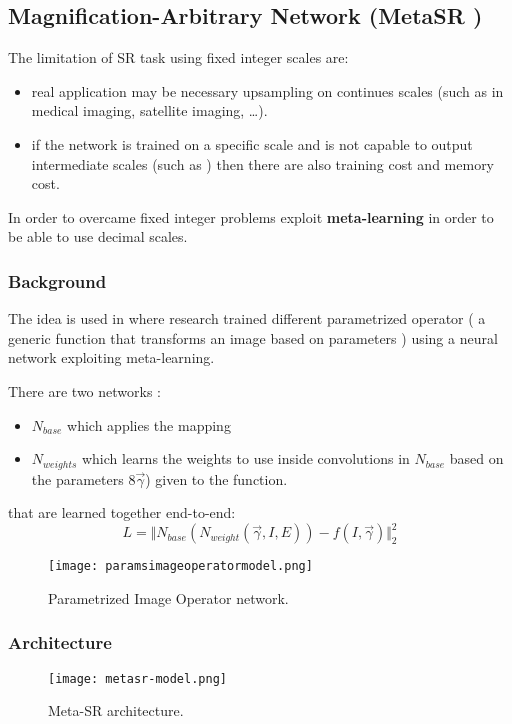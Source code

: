 \subsection{Magnification-Arbitrary Network (MetaSR \cite{MetaSR})}
The limitation of SR task using fixed integer scales are:
\begin{itemize}
    \item real application may be necessary upsampling on continues scales (such as in medical imaging, satellite imaging, \dots ).
    \item if the network is trained on a specific scale and is not capable to output intermediate scales (such as \cite{LapSRN}) then there are also training cost and memory cost.
\end{itemize}

In order to overcame fixed integer problems \cite{MetaSR} exploit \textbf{meta-learning} in order to be able to use decimal scales.

\subsubsection{Background}

The idea is used in \cite{ParametrizedImageOperator} where research trained different parametrized operator ( a generic function that transforms an image based on parameters ) using a neural network exploiting meta-learning.

There are two networks :
\begin{itemize}
    \item $N_{base}$ which applies the mapping
    \item $N_{weights}$ which learns the weights to use inside convolutions in $N_{base}$ based on the parameters 8$\vec{\gamma}$) given to the function. 
\end{itemize}
that are learned together end-to-end: 
$$
L = \Vert N_{base}(N_{weight}(\vec{\gamma},I,E)) - f(I,\vec{\gamma}) \Vert_2^2
$$
\begin{figure}
    \centering
    \texttt{[image: paramsimageoperatormodel.png]}
    \caption{Parametrized Image Operator network.}\label{PIO:model}
\end{figure}

\subsubsection{Architecture}
\begin{figure}
    \centering
    \texttt{[image: metasr-model.png]}
    \caption{Meta-SR architecture.}\label{metasr:model}
\end{figure}

